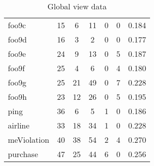 \begin{table}[h]
\begin{tabular}{lccc}
foo9c & 15 & 6 & 11 & 0 & 0 & 0.184 \\ 
foo9d & 16 & 3 & 2 & 0 & 0 & 0.177 \\ 
foo9e & 24 & 9 & 13 & 0 & 5 & 0.187 \\ 
foo9f & 25 & 4 & 6 & 0 & 4 & 0.180 \\ 
foo9g & 25 & 21 & 49 & 0 & 7 & 0.228 \\ 
foo9h & 23 & 12 & 26 & 0 & 5 & 0.195 \\ 
ping & 36 & 6 & 5 & 1 & 0 & 0.186 \\ 
airline & 33 & 18 & 34 & 1 & 0 & 0.228 \\ 
meViolation & 40 & 38 & 54 & 2 & 4 & 0.270 \\ 
purchase & 47 & 25 & 44 & 6 & 0 & 0.256 \\ 
\hline
\end{tabular}
\caption{Global view data}
\end{table}